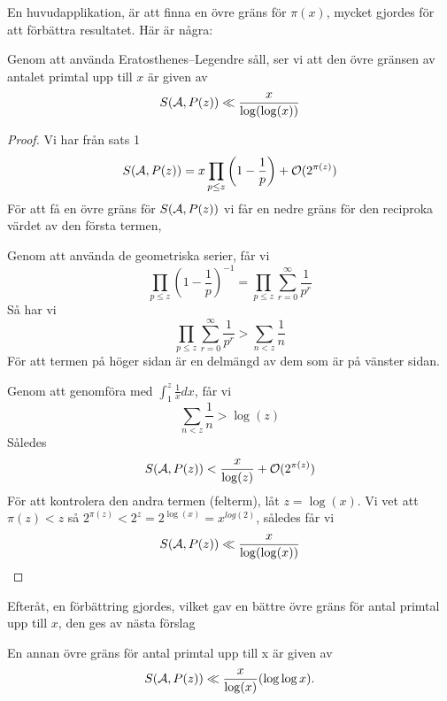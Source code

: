 En huvudapplikation, är att finna en övre gräns för $ \pi(x) $, mycket gjordes för att förbättra resultatet. Här är några:
\begin{proposition}
Genom att använda Eratosthenes–Legendre såll, ser vi att den övre gränsen av antalet primtal upp till $ x $ är given av
\[S(\mathcal{A}, P(z))\ll\frac{x}{\log(\log(x))}\]
\end{proposition}
\begin{proof}
Vi har från sats 1
\[S(\mathcal{A}, P(z))=x \prod_{p\leq z}\left( 1-\frac{1}{p} \right) +\mathcal{O}(2^{\pi(z)})\]
För att få en övre gräns för $ S(\mathcal{A}, P(z)) $ vi får en nedre gräns för den reciproka värdet av den första termen, 

Genom att använda de geometriska serier, får vi
\[\prod_{p\leq z}\left( 1-\frac{1}{p} \right)^{-1}=\prod_{p\leq z}\sum_{r=0}^{\infty}\frac{1}{p^{r}}\]
Så har vi
\[\prod_{p\leq z}\sum_{r=0}^{\infty}\frac{1}{p^{r}}>\sum_{n<z}\frac{1}{n}\]
För att termen på höger sidan är en delmängd av dem som är på vänster sidan.

Genom att genomföra med $ \int_{1}^{z}\frac{1}{x}dx $, får vi
\[\sum_{n<z}\frac{1}{n}>\log(z)\]
Således
\[S(\mathcal{A}, P(z))<\frac{x}{\log(z)}+\mathcal{O}(2^{\pi(z)})\]
För att kontrolera den andra termen (felterm), låt $ z=\log(x)$. Vi vet att $ \pi(z)<z $ så $ 2^{\pi(z)}<2^{z}=2^{\log(x)}=x^{log(2)} $, således får vi
\[S(\mathcal{A}, P(z))\ll\frac{x}{\log(\log(x))}\]
\end{proof}
Efteråt, en förbättring gjordes, vilket gav en bättre övre gräns för antal primtal upp till $ x $, den ges av nästa förslag
\begin{proposition}
En annan övre gräns för antal primtal upp till x är given av
\[S(\mathcal{A}, P(z))\ll\frac{x}{\log(x)}(\log\log x).\]
\end{proposition}

